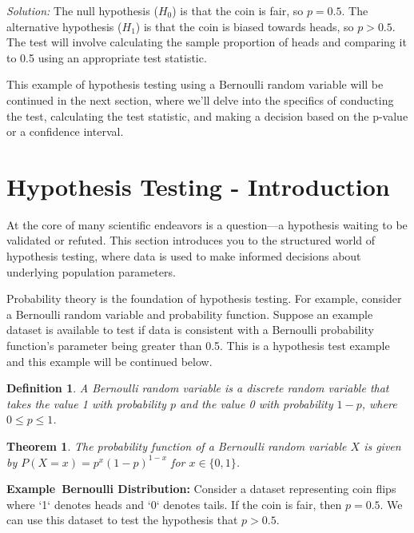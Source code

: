 \documentclass[a4paper,12pt]{book}
\newenvironment{solution}[1][]
{\par\noindent\textit{Solution:} \rmfamily}{\medskip}
\newcounter{example}
\newenvironment{example}[1][\theexample]
  {\refstepcounter{example}\par\medskip\noindent\textbf{Example~#1:} \rmfamily}
  {\medskip}
\newtheorem{theorem}{Theorem}
\newtheorem{definition}{Definition}
\begin{document}
\begin{solution}
The null hypothesis ($H_0$) is that the coin is fair, so $p = 0.5$. The alternative hypothesis ($H_1$) is that the coin is biased towards heads, so $p > 0.5$. The test will involve calculating the sample proportion of heads and comparing it to 0.5 using an appropriate test statistic.
\end{solution}

This example of hypothesis testing using a Bernoulli random variable will be continued in the next section, where we'll delve into the specifics of conducting the test, calculating the test statistic, and making a decision based on the p-value or a confidence interval.

\section{Hypothesis Testing - Introduction}
At the core of many scientific endeavors is a question—a hypothesis waiting to be validated or refuted. This section introduces you to the structured world of hypothesis testing, where data is used to make informed decisions about underlying population parameters. 

Probability theory is the foundation of hypothesis testing. For example, consider a Bernoulli random variable and probability function. Suppose an example dataset is available to test if data is consistent with a Bernoulli probability function's parameter being greater than 0.5. This is a hypothesis test example and this example will be continued below.

\begin{definition}
A \textit{Bernoulli random variable} is a discrete random variable that takes the value 1 with probability $p$ and the value 0 with probability $1-p$, where $0 \leq p \leq 1$.
\end{definition}

\begin{theorem}
The probability function of a Bernoulli random variable $X$ is given by $P(X=x) = p^x(1-p)^{1-x}$ for $x \in \{0,1\}$.
\end{theorem}

\begin{example}[Bernoulli Distribution]
Consider a dataset representing coin flips where `1` denotes heads and `0` denotes tails. If the coin is fair, then $p=0.5$. We can use this dataset to test the hypothesis that $p > 0.5$.
\end{example}
\end{document}

